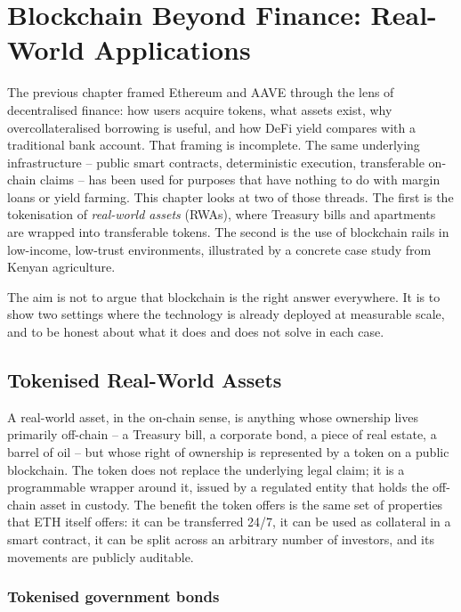 \chapter{Blockchain Beyond Finance: Real-World Applications}
\label{chap:real-world-blockchain}

The previous chapter framed Ethereum and AAVE through the lens of
decentralised finance: how users acquire tokens, what assets exist, why
overcollateralised borrowing is useful, and how DeFi yield compares with a
traditional bank account. That framing is incomplete. The same underlying
infrastructure -- public smart contracts, deterministic execution,
transferable on-chain claims -- has been used for purposes that have nothing
to do with margin loans or yield farming. This chapter looks at two of those
threads. The first is the tokenisation of \emph{real-world assets} (RWAs),
where Treasury bills and apartments are wrapped into transferable tokens.
The second is the use of blockchain rails in low-income, low-trust
environments, illustrated by a concrete case study from Kenyan agriculture.

The aim is not to argue that blockchain is the right answer everywhere. It
is to show two settings where the technology is already deployed at
measurable scale, and to be honest about what it does and does not solve in
each case.

\section{Tokenised Real-World Assets}

A real-world asset, in the on-chain sense, is anything whose ownership lives
primarily off-chain -- a Treasury bill, a corporate bond, a piece of real
estate, a barrel of oil -- but whose right of ownership is represented by a
token on a public blockchain. The token does not replace the underlying
legal claim; it is a programmable wrapper around it, issued by a regulated
entity that holds the off-chain asset in custody. The benefit the token
offers is the same set of properties that ETH itself offers: it can be
transferred 24/7, it can be used as collateral in a smart contract, it can
be split across an arbitrary number of investors, and its movements are
publicly auditable.

\subsection{Tokenised government bonds}

